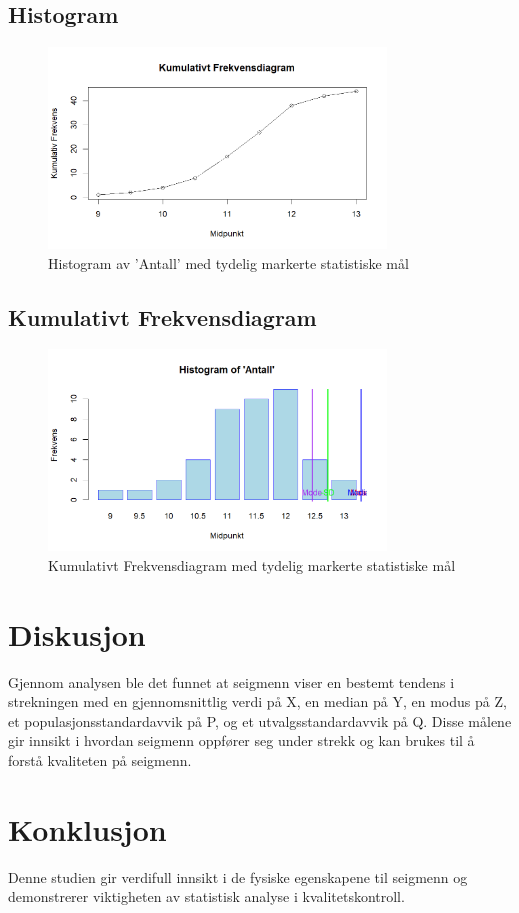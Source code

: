 \documentclass{article}
\begin{document}
\subsection{Histogram}
\begin{figure}[H]
    \centering
    \includegraphics[width=0.8\textwidth]{Rplot.png}
    \caption{Histogram av 'Antall' med tydelig markerte statistiske mål}
\end{figure}

\subsection{Kumulativt Frekvensdiagram}
\begin{figure}[H]
    \centering
    \includegraphics[width=0.8\textwidth]{Rplot02.png}
    \caption{Kumulativt Frekvensdiagram med tydelig markerte statistiske mål}
\end{figure}

\section{Diskusjon}
Gjennom analysen ble det funnet at seigmenn viser en bestemt tendens i strekningen med en gjennomsnittlig verdi på X, en median på Y, en modus på Z, et populasjonsstandardavvik på P, og et utvalgsstandardavvik på Q. Disse målene gir innsikt i hvordan seigmenn oppfører seg under strekk og kan brukes til å forstå kvaliteten på seigmenn.

\section{Konklusjon}
Denne studien gir verdifull innsikt i de fysiske egenskapene til seigmenn og demonstrerer viktigheten av statistisk analyse i kvalitetskontroll.
\end{document}

